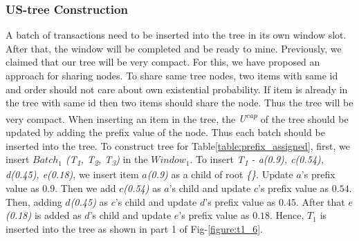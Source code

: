 \documentclass[conference]{IEEEtran}
\begin{document}
\subsubsection{US-tree Construction}
A batch of transactions need to be inserted into the tree in its own window slot. After that, the window will be completed and be ready to mine. Previously, we claimed that our tree will be very compact. For this, we have proposed an approach for sharing nodes. To share same tree nodes, two items with same id and order should not care about own existential probability. If item is already in the tree with same id then two items should share the node. Thus the tree will be very compact. When inserting an item in the tree, the \emph{U\textsuperscript{cap}} of the tree should be updated by adding the prefix value of the node. Thus each batch should be inserted into the tree.
To construct tree for Table\ref{table:prefix_assigned}, first, we insert \emph{$Batch_{1}$ (T\textsubscript{1}, T\textsubscript{2}, T\textsubscript{3})} in the $Window_{1}$. To insert \emph{T\textsubscript{1} - a(0.9), c(0.54), d(0.45), e(0.18)}, we insert item \emph{$a$(0.9)} as a child of root \emph{\{\}}. Update $a$'s prefix value as $0.9$. Then we add \emph{$c$(0.54)} as $a$'s child and update $c$'s prefix value as $0.54$. Then, adding \emph{$d$(0.45)} as $c$'s child and update $d$'s prefix value as $0.45$. After that \emph{$e$(0.18)} is added as $d$'s child and update $e$'s prefix value as $0.18$. Hence, \emph{$T_{1}$} is inserted into the tree as shown in part 1 of Fig-\ref{figure:t1_6}.
\end{document}
